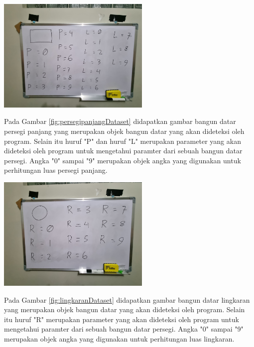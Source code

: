 \begin{center}
	\includegraphics[width=0.55\textwidth]{gambar/Persegi Panjang Dataset.jpg}	
	\label{fig:persegipanjangDataset}
\end{center}
Pada Gambar \ref{fig:persegipanjangDataset} didapatkan gambar bangun datar persegi panjang yang merupakan objek bangun datar yang akan dideteksi oleh program. Selain itu huruf "P" dan huruf "L" merupakan parameter yang akan dideteksi oleh program untuk mengetahui paramter dari sebuah bangun datar persegi. Angka "0" sampai "9" merupakan objek angka yang digunakan untuk perhitungan luas persegi panjang.

\begin{center}
	\includegraphics[width=0.55\textwidth]{gambar/Lingkaran Dataset.jpg}	
	\label{fig:lingkaranDataset}
\end{center}
Pada Gambar \ref{fig:lingkaranDataset} didapatkan gambar bangun datar lingkaran yang merupakan objek bangun datar yang akan dideteksi oleh program. Selain itu huruf "R" merupakan parameter yang akan dideteksi oleh program untuk mengetahui paramter dari sebuah bangun datar persegi. Angka "0" sampai "9" merupakan objek angka yang digunakan untuk perhitungan luas lingkaran.

